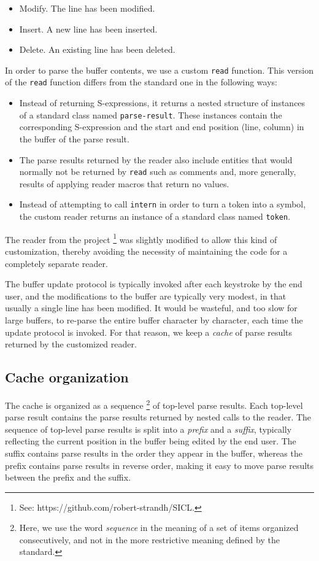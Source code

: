 \begin{itemize}
\item Modify.  The line has been modified.
\item Insert.  A new line has been inserted.
\item Delete.  An existing line has been deleted.
\end{itemize}

In order to parse the buffer contents, we use a custom \texttt{read}
function.  This version of the \texttt{read} function differs from the
standard one in the following ways:

\begin{itemize}
\item Instead of returning S-expressions, it returns a nested
  structure of instances of a standard class named
  \texttt{parse-result}.  These instances contain the corresponding
  S-expression and the start and end position (line, column) in the
  buffer of the parse result.
\item The parse results returned by the reader also include entities
  that would normally not be returned by \texttt{read} such as
  comments and, more generally, results of applying reader macros
  that return no values.
\item Instead of attempting to call \texttt{intern} in order to turn a
  token into a symbol, the custom reader returns an instance of a
  standard class named \texttt{token}.
\end{itemize}

The reader from the \sicl{} project%
\footnote{See: https://github.com/robert-strandh/SICL.}  was slightly
modified to allow this kind of customization, thereby avoiding the
necessity of maintaining the code for a completely separate reader.

The buffer update protocol is typically invoked after each keystroke
by the end user, and the modifications to the buffer are typically
very modest, in that usually a single line has been modified.  It
would be wasteful, and too slow for large buffers, to re-parse the
entire buffer character by character, each time the update protocol is
invoked.  For that reason, we keep a \emph{cache} of parse results
returned by the customized reader.

\subsection{Cache organization}

The cache is organized as a sequence%
\footnote{Here, we use the word \emph{sequence} in the meaning of a
  set of items organized consecutively, and not in the more
  restrictive meaning defined by the \commonlisp{} standard.}  of
top-level parse results.  Each top-level parse result contains the
parse results returned by nested calls to the reader.  The sequence of
top-level parse results is split into a \emph{prefix} and a
\emph{suffix}, typically reflecting the current position in the buffer
being edited by the end user.  The suffix contains parse results in
the order they appear in the buffer, whereas the prefix contains parse
results in reverse order, making it easy to move parse results between
the prefix and the suffix.

